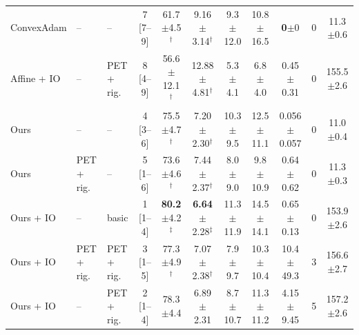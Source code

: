 \begin{table}[t]
{\begin{tabular}{lllcccccccc}
ConvexAdam & -- & -- & 7 [7--9] & 61.7$\pm$4.5$^{\dagger}$ & 9.16$\pm$3.14$^{\dagger}$ & 9.3$\pm$12.0 & 10.8$\pm$16.5 & \textbf{0}$\pm$0 & 0 & 11.3$\pm$0.6 \\
Affine + IO & -- & PET + rig. & 8 [4--9] & 56.6$\pm$12.1$^{\dagger}$ & 12.88$\pm$4.81$^{\dagger}$ & 5.3$\pm$4.1 & 6.8$\pm$4.0 & 0.45$\pm$0.31 & 0 & 155.5$\pm$2.6 \\
\midrule
Ours & -- & -- & 4 [3--6] & 75.5$\pm$4.7$^{\dagger}$ & 7.20$\pm$2.30$^{\dagger}$ & 10.3$\pm$9.5 & 12.5$\pm$11.1 & 0.056$\pm$0.057 & 0 & 11.0$\pm$0.4 \\
Ours & PET + rig. & -- & 5 [1--6] & 73.6$\pm$4.6$^{\dagger}$ & 7.44$\pm$2.37$^{\dagger}$ & 8.0$\pm$9.0 & 9.8$\pm$10.9 & 0.64$\pm$0.62 & 0 & 11.3$\pm$0.3 \\
Ours + IO & -- & basic & 1 [1--4] & \textbf{80.2}$\pm$4.2$^{\ddagger}$ & \textbf{6.64}$\pm$2.28$^{\ddagger}$ & 11.3$\pm$11.9 & 14.5$\pm$14.1 & 0.65$\pm$0.13 & 0 & 153.9$\pm$2.6 \\
Ours + IO & PET + rig. & PET + rig. & 3 [1--5] & 77.3$\pm$4.9$^{\dagger}$ & 7.07$\pm$2.38$^{\dagger}$ & 7.9$\pm$9.7 & 10.3$\pm$10.4 & 10.4$\pm$49.3 & 3 & 156.6$\pm$2.7 \\
Ours + IO & -- & PET + rig. & 2 [1--4] & 78.3$\pm$4.4 & 6.89$\pm$2.31 & 8.7$\pm$10.7 & 11.3$\pm$11.2 & 4.15$\pm$9.45 & 5 & 157.2$\pm$2.6 \\
\bottomrule
\end{tabular}}
\end{table}

